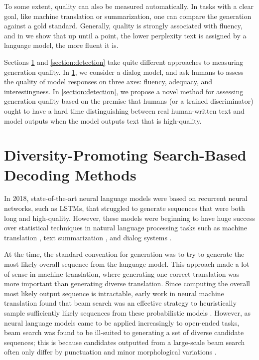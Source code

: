 To some extent, quality can also be measured automatically.
In tasks with a clear goal, like machine translation or summarization, one can compare the generation against a gold standard.
Generally, quality is strongly associated with fluency, and in  we show that up until a point, the lower perplexity text is assigned by a language model, the more fluent it is.

Sections \ref{section:dediv} and \ref{section:detection} take quite different approaches to measuring generation quality.
In \ref{section:dediv}, we consider a dialog model, and ask humans to assess the quality of model responses on three axes: fluency, adequacy, and interestingness.
In  \ref{section:detection}, we propose a novel method for assessing generation quality based on the premise that humans (or a trained discriminator) ought to have a hard time distinguishing between real human-written text and model outputs when the model outputs text that is high-quality.

\section{Diversity-Promoting Search-Based Decoding Methods}
\label{section:dediv}

In 2018, state-of-the-art neural language models were based on recurrent neural networks, such as LSTMs, that struggled to generate sequences that were both long and high-quality.
However, these models were beginning to have huge success over statistical techniques in natural language processing tasks such as machine translation \cite{sutskever2014sequence,Luong2015EffectiveAT}, text summarization \cite{Nallapati2016AbstractiveTS}, and dialog systems \cite{vinyals2015neural}.

At the time, the standard convention for generation was to try to generate the most likely overall sequence from the language model.
This approach made a lot of sense in machine translation, where generating one correct translation was more important than generating diverse translation.
Since computing the overall most likely output sequence is intractable, early work in neural machine translation found that beam search was an effective strategy to heuristically sample sufficiently likely sequences from these probabilistic models \cite{sutskever2014sequence}.
However, as neural language models came to be applied increasingly to open-ended tasks, beam search was found to be ill-suited to generating a set of diverse candidate sequences; this is because candidates outputted from a large-scale beam search often only differ by punctuation and minor morphological variations \cite{li2016mutual}.

